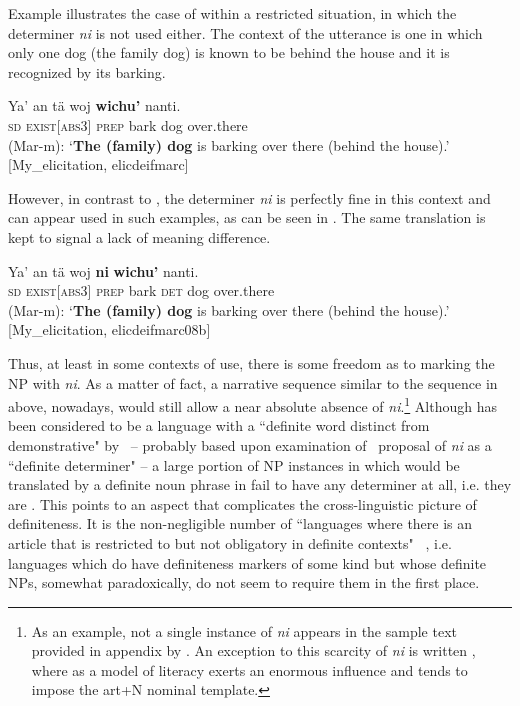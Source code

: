 \documentclass[output=paper
,modfonts
,nonflat]{langsci/langscibook}
\begin{document}
Example  illustrates the case of  within a restricted situation, in which the determiner \textit{ni} is not used either. The context of the utterance is one in which only one dog (the family dog) is known to be behind the house and it is recognized by its barking. 


\ea \label{ex:pico:8}
\gll Ya' an t\"a woj \textbf{wichu'} nanti. \\
\textsc{sd} \textsc{exist[abs3]} \textsc{prep} {bark} {dog} {over.there} \\
\glt (Mar-m): `\textbf{The (family) dog} is barking over there (behind the house).' [My\_elicitation, elic\textunderscore deif\textunderscore marc]
\z


However, in contrast to , the determiner \textit{ni} is perfectly fine in this context and can appear used in such examples, as can be seen in . The same translation is kept to signal a lack of meaning difference.


\ea \label{ex:pico:9}
\gll Ya' an t\"a woj \textbf{ni} \textbf{wichu'} nanti. \\
\textsc{sd} \textsc{exist[abs3]} \textsc{prep} {bark} \textsc{det} {dog} {over.there} \\
\glt (Mar-m): `\textbf{The (family) dog} is barking over there (behind the house).' [My\_elicitation, elic\textunderscore deif\textunderscore marc\textunderscore08b]
\z


Thus, at least in some contexts of use, there is some freedom as to marking the NP with \textit{ni}. As a matter of fact, a narrative sequence similar to the sequence in  above, nowadays, would still allow a near absolute absence of \textit{ni}.\footnote{As an example, not a single instance of \textit{ni} appears in the sample text provided in appendix by \citet[][371--382]{Knowles1984}. An exception to this scarcity of \textit{ni} is written , where  as a model of literacy exerts an enormous influence and tends to impose the art+N nominal template.} Although  has been considered to be a language with a ``definite word distinct from demonstrative" by~\citet{Dryer2005definiteart} -- probably based upon examination of~ proposal of \textit{ni} as a ``definite determiner" -- a large portion of NP instances in  which would be translated by a definite noun phrase in  fail to have any determiner at all, i.e. they are . This points to an aspect that complicates the cross-linguistic picture of definiteness. It is the non-negligible number of ``languages where there is an article that is restricted to but not obligatory in definite contexts" ~\citep[e234]{Dryer2014}, i.e. languages which do have definiteness markers of some kind but whose definite NPs, somewhat paradoxically, do not seem to require them in the first place.
\end{document}
